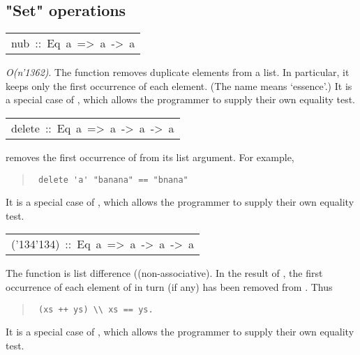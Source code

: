 \subsection{"Set" operations
}
\begin{haddockdesc}
\item[\begin{tabular}{@{}l}
nub\ ::\ Eq\ a\ =>\ {\char 91}a{\char 93}\ ->\ {\char 91}a{\char 93}
\end{tabular}]\haddockbegindoc
\emph{O(n{\char '136}2)}. The  function removes duplicate elements from a list.
 In particular, it keeps only the first occurrence of each element.
 (The name  means `essence'.)
 It is a special case of , which allows the programmer to supply
 their own equality test.
\par

\end{haddockdesc}
\begin{haddockdesc}
\item[\begin{tabular}{@{}l}
delete\ ::\ Eq\ a\ =>\ a\ ->\ {\char 91}a{\char 93}\ ->\ {\char 91}a{\char 93}
\end{tabular}]\haddockbegindoc
{}  removes the first occurrence of  from its list argument.
 For example,
\par
\begin{quote}
{\haddockverb\begin{verbatim}
 delete 'a' "banana" == "bnana"
\end{verbatim}}
\end{quote}
It is a special case of , which allows the programmer to
 supply their own equality test.
\par

\end{haddockdesc}
\begin{haddockdesc}
\item[\begin{tabular}{@{}l}
({\char '134}{\char '134})\ ::\ Eq\ a\ =>\ {\char 91}a{\char 93}\ ->\ {\char 91}a{\char 93}\ ->\ {\char 91}a{\char 93}
\end{tabular}]\haddockbegindoc
The  function is list difference ((non-associative).
 In the result of   , the first occurrence of each element of
  in turn (if any) has been removed from .  Thus
\par
\begin{quote}
{\haddockverb\begin{verbatim}
 (xs ++ ys) \\ xs == ys.
\end{verbatim}}
\end{quote}
It is a special case of , which allows the programmer
 to supply their own equality test.
\par

\end{haddockdesc}
